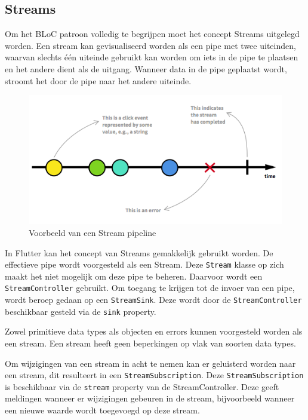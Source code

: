 \subsection*{Streams}
Om het BLoC patroon volledig te begrijpen moet het concept Streams uitgelegd worden.
Een stream kan gevisualiseerd worden als een pipe met twee uiteinden, waarvan slechts
één uiteinde gebruikt kan worden om iets in de pipe te plaatsen en het andere dient als de uitgang. Wanneer data in de pipe
geplaatst wordt, stroomt het door de pipe naar het andere uiteinde. \autocite{Boelens2018}

\begin{figure}[H]
    \centering
    \includegraphics[width=\figureWidthModifier\linewidth]{img/stand-van-zaken/stream-pipeline.png}
    \caption{Voorbeeld van een Stream pipeline \autocite{Staltz2019}} 
    \label{fig:stream-pipeline}
\end{figure}

In Flutter kan het concept van Streams gemakkelijk gebruikt worden. De effectieve pipe wordt voorgesteld als een Stream. Deze \verb|Stream| klasse op zich maakt het niet mogelijk om deze pipe te beheren.
Daarvoor wordt een \verb|StreamController| gebruikt. Om toegang te krijgen tot de invoer van een pipe, wordt beroep gedaan op een \verb|StreamSink|. Deze wordt door de \verb|StreamController| beschikbaar gesteld via de \verb|sink| property.

Zowel primitieve data types als objecten en errors kunnen voorgesteld worden als een stream. Een stream heeft geen beperkingen op vlak van soorten data types.

Om wijzigingen van een stream in acht te nemen kan er geluisterd worden naar een stream, dit resulteert in een \verb|StreamSubscription|. Deze \verb|StreamSubscription| is beschikbaar via de \verb|stream| property van de StreamController. Deze geeft meldingen wanneer er wijzigingen gebeuren in de stream, bijvoorbeeld wanneer een nieuwe waarde wordt toegevoegd op deze stream.


